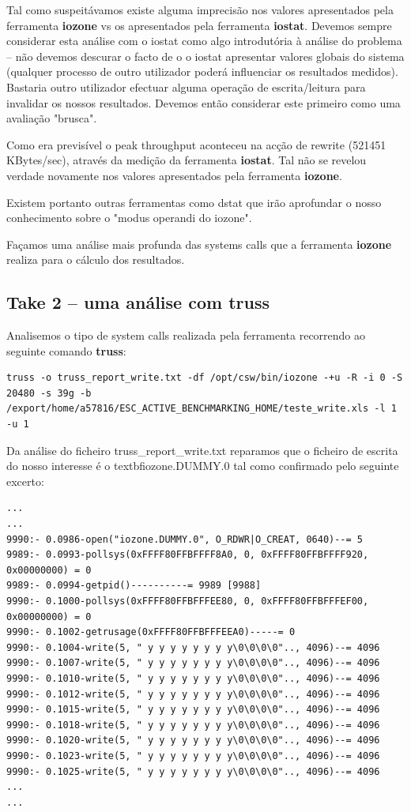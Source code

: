 \documentclass[a4paper]{article}
\begin{document}
{Tal como suspeitávamos existe alguma imprecisão nos valores apresentados pela ferramenta \textbf{iozone} vs os apresentados pela ferramenta \textbf{iostat}. Devemos sempre considerar esta análise com o iostat como algo introdutória à análise do problema -- não devemos descurar o facto de o o iostat apresentar valores globais do sistema (qualquer processo de outro utilizador poderá influenciar os resultados medidos). Bastaria outro utilizador efectuar alguma operação de escrita/leitura para invalidar os nossos resultados. Devemos então considerar este primeiro como uma avaliação "brusca". \par 
 Como era previsível o peak throughput aconteceu na acção de rewrite (521451 KBytes/sec), através da medição da ferramenta \textbf{iostat}. Tal não se revelou verdade novamente nos valores apresentados pela ferramenta \textbf{iozone}.  \par 
 Existem portanto outras ferramentas como dstat que irão aprofundar o nosso conhecimento sobre o "modus operandi do iozone".
\par 
Façamos uma análise mais profunda das systems calls que a ferramenta \textbf{iozone} realiza para o cálculo dos resultados.

\subsection{Take 2 -- uma análise com truss}

Analisemos o tipo de system calls realizada pela ferramenta recorrendo ao seguinte comando \textbf{truss}:

\begin{lstlisting}[style=command]
truss -o truss_report_write.txt -df /opt/csw/bin/iozone -+u -R -i 0 -S 20480 -s 39g -b /export/home/a57816/ESC_ACTIVE_BENCHMARKING_HOME/teste_write.xls -l 1 -u 1 
\end{lstlisting}

Da análise do ficheiro truss\_report\_write.txt reparamos que o ficheiro de escrita do nosso interesse é o textbf{iozone.DUMMY.0} tal como confirmado pelo seguinte excerto: 
\begin{lstlisting}
...
...
9990:- 0.0986-open("iozone.DUMMY.0", O_RDWR|O_CREAT, 0640)--= 5
9989:- 0.0993-pollsys(0xFFFF80FFBFFFF8A0, 0, 0xFFFF80FFBFFFF920, 0x00000000) = 0
9989:- 0.0994-getpid()----------= 9989 [9988]
9990:- 0.1000-pollsys(0xFFFF80FFBFFFEE80, 0, 0xFFFF80FFBFFFEF00, 0x00000000) = 0
9990:- 0.1002-getrusage(0xFFFF80FFBFFFEEA0)-----= 0
9990:- 0.1004-write(5, " y y y y y y y y\0\0\0\0".., 4096)--= 4096
9990:- 0.1007-write(5, " y y y y y y y y\0\0\0\0".., 4096)--= 4096
9990:- 0.1010-write(5, " y y y y y y y y\0\0\0\0".., 4096)--= 4096
9990:- 0.1012-write(5, " y y y y y y y y\0\0\0\0".., 4096)--= 4096
9990:- 0.1015-write(5, " y y y y y y y y\0\0\0\0".., 4096)--= 4096
9990:- 0.1018-write(5, " y y y y y y y y\0\0\0\0".., 4096)--= 4096
9990:- 0.1020-write(5, " y y y y y y y y\0\0\0\0".., 4096)--= 4096
9990:- 0.1023-write(5, " y y y y y y y y\0\0\0\0".., 4096)--= 4096
9990:- 0.1025-write(5, " y y y y y y y y\0\0\0\0".., 4096)--= 4096
...
...
\end{lstlisting}

}
\end{document}
